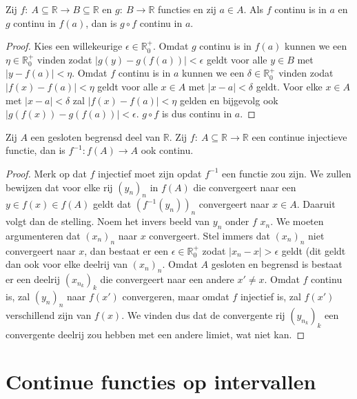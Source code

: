 \documentclass[main.tex]{subfiles}
\begin{document}
\begin{pr}
  Zij $f:\ A \subseteq \mathbb{R} \rightarrow B \subseteq \mathbb{R}$ en $g:\ B \rightarrow \mathbb{R}$ functies en zij $a\in A$.
  Als $f$ continu is in $a$ en $g$ continu in $f(a)$, dan is $g\circ f$ continu in $a$.

  \begin{proof}
    Kies een willekeurige $\epsilon \in \mathbb{R}_{0}^{+}$.
    Omdat $g$ continu is in $f(a)$ kunnen we een $\eta\in\mathbb{R}_{0}^{+}$ vinden zodat $|g(y)-g(f(a))|<\epsilon$ geldt voor alle $y\in B$ met $|y-f(a)|<\eta$.
    Omdat $f$ continu is in $a$ kunnen we een $\delta\in \mathbb{R}_{0}^{+}$ vinden zodat $|f(x)-f(a)| < \eta$ geldt voor alle $x\in A$ met $|x-a|<\delta$ geldt.
    Voor elke $x\in A$ met $|x-a|<\delta$ zal $|f(x)-f(a)| < \eta$ gelden en bijgevolg ook $|g(f(x))-g(f(a))|<\epsilon$.
    $g\circ f$ is dus continu in $a$.
  \end{proof}
\end{pr}

\begin{pr}
  Zij $A$ een gesloten begrensd deel van $\mathbb{R}$.
  Zij $f: \ A \subseteq \mathbb{R} \rightarrow \mathbb{R}$ een continue injectieve functie, dan is $f^{-1}: f(A) \rightarrow A$ ook continu.

  \begin{proof}
    Merk op dat $f$ injectief moet zijn opdat $f^{-1}$ een functie zou zijn.
    We zullen bewijzen dat voor elke rij $(y_{n})_{n}$ in $f(A)$ die convergeert naar een $y\in f(x) \in f(A)$ geldt dat $(f^{-1}(y_{n}))_{n}$ convergeert naar $x\in A$.
    Daaruit volgt dan de stelling.
    Noem het invers beeld van $y_{n}$ onder $f$ $x_{n}$.
    We moeten argumenteren dat $(x_{n})_{n}$ naar $x$ convergeert.
    Stel immers dat $(x_{n})_{n}$ niet convergeert naar $x$, dan bestaat er een $\epsilon \in \mathbb{R}_{0}^{+}$ zodat $|x_{n}-x|> \epsilon$ geldt (dit geldt dan ook voor elke deelrij van $(x_{n})_{n}$.
    Omdat $A$ gesloten en begrensd is bestaat er een deelrij $(x_{n_{k}})_{k}$ die convergeert naar een andere $x'\neq x$.
    Omdat $f$ continu is, zal $(y_{n})_{n}$ naar $f(x')$ convergeren, maar omdat $f$ injectief is, zal $f(x')$ verschillend zijn van $f(x)$.
    We vinden dus dat de convergente rij $(y_{n_{k}})_{k}$ een convergente deelrij zou hebben met een andere limiet, wat niet kan.
  \end{proof}
\end{pr}

\section{Continue functies op intervallen}
\label{sec:continue-functies-op}
\end{document}
